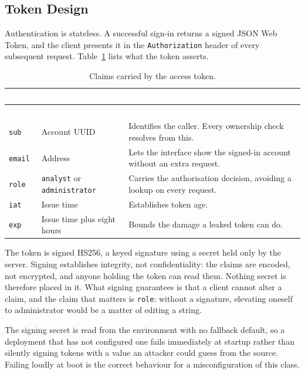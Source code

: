 \subsection{Token Design}

Authentication is stateless. A successful sign-in returns a signed JSON Web
Token\citep{rfc7519}, and the client presents it in the \texttt{Authorization} header of
every subsequent request. Table~\ref{tab:jwtclaims} lists what the token asserts.

\begin{longtable}{|p{}|p{}|p{}|}
\caption{Claims carried by the access token.}\label{tab:jwtclaims}\\
\hline
\rowcolor{myblue}\textcolor{white}{\textbf{Claim}} & \textcolor{white}{\textbf{Value}} & \textcolor{white}{\textbf{Why it is present}} \\
\hline
\endfirsthead
\hline
\rowcolor{myblue}\textcolor{white}{\textbf{Claim}} & \textcolor{white}{\textbf{Value}} & \textcolor{white}{\textbf{Why it is present}} \\
\hline
\endhead
\texttt{sub} & Account UUID & Identifies the caller. Every ownership check resolves from this. \\ \hline
\texttt{email} & Address & Lets the interface show the signed-in account without an extra request. \\ \hline
\texttt{role} & \texttt{analyst} or \texttt{administrator} & Carries the authorisation decision, avoiding a lookup on every request. \\ \hline
\texttt{iat} & Issue time & Establishes token age. \\ \hline
\texttt{exp} & Issue time plus eight hours & Bounds the damage a leaked token can do. \\ \hline
\end{longtable}

The token is signed HS256\citep{rfc7515}, a keyed signature using a secret held only by the
server. Signing establishes integrity, not confidentiality: the claims are encoded, not
encrypted, and anyone holding the token can read them. Nothing secret is therefore placed in
it. What signing guarantees is that a client cannot alter a claim, and the claim that matters
is \texttt{role}: without a signature, elevating oneself to administrator would be a matter
of editing a string.

The signing secret is read from the environment with no fallback default, so a deployment
that has not configured one fails immediately at startup rather than silently signing tokens
with a value an attacker could guess from the source. Failing loudly at boot is the correct
behaviour for a misconfiguration of this class.

